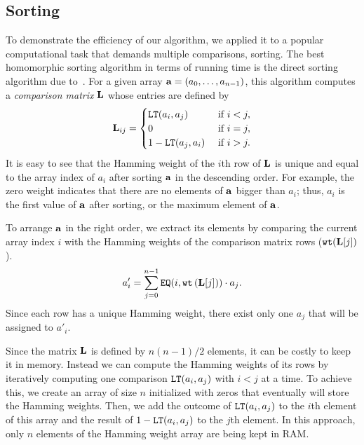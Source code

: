 \subsection{Sorting}
\label{subsec:sorting}

        To demonstrate the efficiency of our algorithm, we applied it to a popular computational task that demands multiple comparisons, sorting.
	The best homomorphic sorting algorithm in terms of running time is the direct sorting algorithm due to~\cite{CDSS15}.
	For a given array $\mathbf{a} = (a_0,\dots,a_{n-1})$, this algorithm computes a \emph{comparison matrix} $\mathbf{L}$ whose entries are defined by
	\begin{align*}
		\mathbf{L}_{ij} =
		\begin{cases}
			\mathtt{LT}(a_i, a_j) & \text{ if } i < j, \\
			0 & \text{ if } i = j, \\
			1 - \mathtt{LT}(a_j, a_i) & \text{ if } i > j.
		\end{cases}
	\end{align*}
	It is easy to see that the Hamming weight of the $i$th row of $\mathbf{L}$ is unique and equal to the array index of $a_i$ after sorting $\mathbf{a}$ in the descending order.
	For example, the zero weight indicates that there are no elements of $\mathbf{a}$ bigger than $a_i$; thus, $a_i$ is the first value of $\mathbf{a}$ after sorting, or the maximum element of $\mathbf{a}$.

	To arrange $\mathbf{a}$ in the right order, we extract its elements by comparing the current array index $i$ with the Hamming weights of the comparison matrix rows ($\texttt{wt}(\mathbf{L}[j])$).  
	\begin{align*}
		a'_i = \sum_{j=0}^{n-1} \mathtt{EQ}(i,\texttt{wt}\left(\mathbf{L}[j]\right)) \cdot a_j.
	\end{align*}
	Since each row has a unique Hamming weight, there exist only one $a_j$ that will be assigned to $a'_i$.

	\begin{remark}
		Since the matrix $\mathbf{L}$ is defined by $n(n-1)/2$ elements, it can be costly to keep it in memory.
		Instead we can compute the Hamming weights of its rows by iteratively computing one comparison $\mathtt{LT}(a_i, a_j)$ with $i < j$ at a time.
		To achieve this, we create an array of size $n$ initialized with zeros that eventually will store the Hamming weights.
		Then, we add the outcome of $\mathtt{LT}(a_i, a_j)$ to the $i$th element of this array and the result of $1-\mathtt{LT}(a_i, a_j)$ to the $j$th element.
		In this approach, only $n$ elements of the Hamming weight array are being kept in RAM.
	\end{remark}

